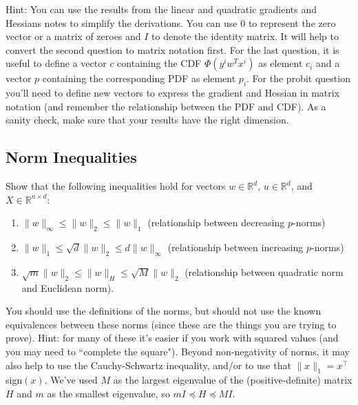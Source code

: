 \documentclass{article}
\def\blu#1{{\color{blu}#1}}
\def\norm#1{\|#1\|}
\def\R{\mathbb{R}}
\def\enum#1{\begin{enumerate}#1\end{enumerate}}
\begin{document}
Hint: You can use the results from the linear and quadratic gradients and Hessians notes to simplify the derivations. You can use $0$ to represent the zero vector or a matrix of zeroes and $I$ to denote the identity matrix. It will help to convert the second question to matrix notation first. For the last question, it is useful to define a vector $c$ containing the CDF $\Phi(y^iw^Tx^i)$ as element $c_i$ and a vector $p$ containing the corresponding PDF as element $p_i$. For the probit question you'll need to define new vectors to express the gradient and Hessian in matrix notation (and remember the relationship between the PDF and CDF). As a sanity check, make sure that your results have the right dimension.


\subsection{Norm Inequalities}

Show that the following inequalities hold for vectors $w \in \R^d$, $u \in \R^d$, and $X \in \R^{n\times d}$:
\blu{\enum{
\item $\norm{w}_\infty \leq \norm{w}_2 \leq \norm{w}_1$ (relationship between decreasing $p$-norms)
\item $\norm{w}_1 \leq \sqrt{d}\norm{w}_2 \leq d\norm{w}_\infty$ (relationship between increasing $p$-norms)
\item $\sqrt{m}\norm{w}_2 \leq \norm{w}_H \leq \sqrt{M}\norm{w}_2$ (relationship between quadratic norm and Euclidean norm).
}
}
You should use the definitions of the norms, but should not use the
known equivalences between these norms (since these are the things you are trying to prove).
Hint: for many of these it's easier if you work with squared values (and you may need to ``complete the square"). Beyond non-negativity of norms, it may also help to use the Cauchy-Schwartz inequality, and/or to use that $\norm{x}_1 = x^\top $sign$(x)$. We've used $M$ as the largest eigenvalue of the (positive-definite) matrix $H$ and $m$ as the smallest eigenvalue, so $mI \preceq H \preceq MI$.
\end{document}
